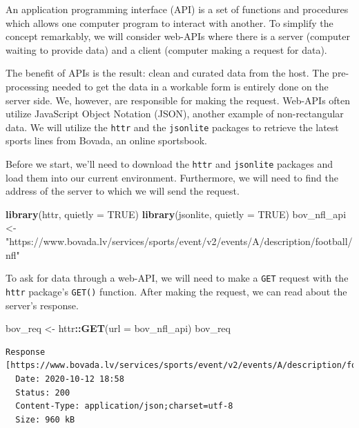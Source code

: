 \documentclass[
]{article}
\newenvironment{Shaded}{\begin{snugshade}}{\end{snugshade}}
\newcommand{\DataTypeTok}[1]{\textcolor[rgb]{0.13,0.29,0.53}{#1}}
\newcommand{\KeywordTok}[1]{\textcolor[rgb]{0.13,0.29,0.53}{\textbf{#1}}}
\newcommand{\NormalTok}[1]{#1}
\newcommand{\OperatorTok}[1]{\textcolor[rgb]{0.81,0.36,0.00}{\textbf{#1}}}
\newcommand{\OtherTok}[1]{\textcolor[rgb]{0.56,0.35,0.01}{#1}}
\newcommand{\StringTok}[1]{\textcolor[rgb]{0.31,0.60,0.02}{#1}}
\begin{document}
An application programming interface (API) is a set of functions and procedures which allows one computer program to interact with another. To simplify the concept remarkably, we will consider web-APIs where there is a server (computer waiting to provide data) and a client (computer making a request for data).

The benefit of APIs is the result: clean and curated data from the host. The pre-processing needed to get the data in a workable form is entirely done on the server side. We, however, are responsible for making the request. Web-APIs often utilize JavaScript Object Notation (JSON), another example of non-rectangular data. We will utilize the \texttt{httr} and the \texttt{jsonlite} packages to retrieve the latest sports lines from Bovada, an online sportsbook.

Before we start, we'll need to download the \texttt{httr} and \texttt{jsonlite} packages and load them into our current environment. Furthermore, we will need to find the address of the server to which we will send the request.

\begin{Shaded}
\begin{Highlighting}[]
\KeywordTok{library}\NormalTok{(httr, }\DataTypeTok{quietly =} \OtherTok{TRUE}\NormalTok{)}
\KeywordTok{library}\NormalTok{(jsonlite, }\DataTypeTok{quietly =} \OtherTok{TRUE}\NormalTok{)}
\NormalTok{bov_nfl_api <-}\StringTok{ "https://www.bovada.lv/services/sports/event/v2/events/A/description/football/nfl"}
\end{Highlighting}
\end{Shaded}

To ask for data through a web-API, we will need to make a \texttt{GET} request with the \texttt{httr} package's \texttt{GET()} function. After making the request, we can read about the server's response.

\begin{Shaded}
\begin{Highlighting}[]
\NormalTok{bov_req <-}\StringTok{ }\NormalTok{httr}\OperatorTok{::}\KeywordTok{GET}\NormalTok{(}\DataTypeTok{url =}\NormalTok{ bov_nfl_api)}
\NormalTok{bov_req}
\end{Highlighting}
\end{Shaded}

\begin{verbatim}
Response [https://www.bovada.lv/services/sports/event/v2/events/A/description/football/nfl]
  Date: 2020-10-12 18:58
  Status: 200
  Content-Type: application/json;charset=utf-8
  Size: 960 kB
\end{verbatim}
\end{document}
